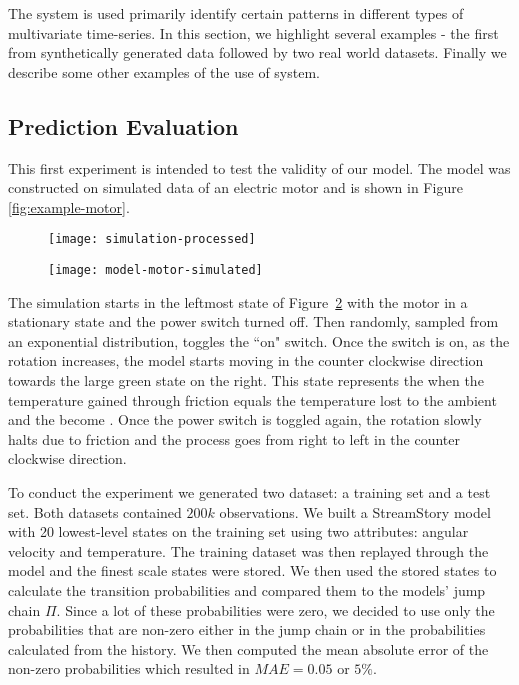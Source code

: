 The system is used primarily identify certain patterns in different types of multivariate time-series. In this section, we highlight several examples - the first from synthetically generated data followed by two real world datasets. Finally we describe some other examples of the use of system.

\subsection{Prediction Evaluation}

This first experiment is intended to test the validity of our model. The model was constructed on simulated data of 
an electric motor and is shown in Figure \ref{fig:example-motor}. 
\begin{figure*}[]
  	\centering
  	\begin{subfigure}[b]{.48\textwidth}
	  	\centering
	  	\texttt{[image: simulation-processed]}
  		\caption{\label{fig:simulation-chart}}
	\end{subfigure}
  	\begin{subfigure}[b]{.48\textwidth}
	  	\centering
	  	\texttt{[image: model-motor-simulated]}
  		\caption{\label{fig:simulation-model}}
	\end{subfigure}
  	\caption{Simulation of an electric motor plotted as a standard time-chart \ref{fig:simulation-chart} and our qualitative model \ref{fig:simulation-model}.}
  	\label{fig:example-motor}
\end{figure*}
The simulation starts in the leftmost state of Figure~\ref{fig:simulation-model} with the motor in a stationary state
and the power switch turned off. Then  randomly, sampled from an exponential distribution,
toggles the ``on" switch. Once the switch is on, as the rotation increases, the model starts moving in the counter clockwise
direction towards the large green state on the right. This state represents the  when the temperature
gained through friction equals the temperature lost to the ambient and the  become .
Once the power switch is toggled again, the rotation slowly halts due to friction and the process goes from right to
left in the counter clockwise direction.

To conduct the experiment we generated two dataset: a training set and a test set. Both datasets
contained $200k$ observations. We built a StreamStory model with 20 lowest-level states on the training set using two attributes:
angular velocity and temperature. The training dataset was then replayed through the model and the finest scale states were stored. We then used
the stored states to calculate the transition probabilities and compared them to the models' jump chain $\Pi$. Since a lot of these probabilities were zero, we decided to use only the probabilities that
are non-zero either in the jump chain or in the probabilities calculated from the history. We then
computed the mean absolute error of the non-zero probabilities which resulted in $MAE=0.05$ or $5\%$.

